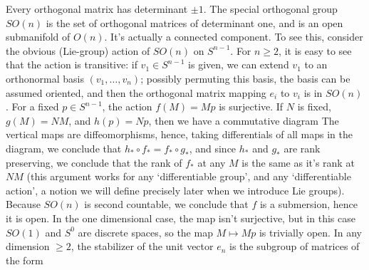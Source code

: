 \begin{example}
    Every orthogonal matrix has determinant $\pm 1$. The special orthogonal group $SO(n)$ is the set of orthogonal matrices of determinant one, and is an open submanifold of $O(n)$. It's actually a connected component. To see this, consider the obvious (Lie-group) action of $SO(n)$ on $S^{n-1}$. For $n \geq 2$, it is easy to see that the action is transitive: if $v_1 \in S^{n-1}$ is given, we can extend $v_1$ to an orthonormal basis $(v_1, \dots, v_n)$; possibly permuting this basis, the basis can be assumed oriented, and then the orthogonal matrix mapping $e_i$ to $v_i$ is in $SO(n)$.
    For a fixed $p \in S^{n-1}$, the action $f(M) = Mp$ is surjective. If $N$ is fixed, $g(M) = NM$, and $h(p) = Np$, then we have a commutative diagram
    The vertical maps are diffeomorphisms, hence, taking differentials of all maps in the diagram, we conclude that $h_* \circ f_* = f_* \circ g_*$, and since $h_*$ and $g_*$ are rank preserving, we conclude that the rank of $f_*$ at any $M$ is the same as it's rank at $NM$ (this argument works for any `differentiable group', and any `differentiable action', a notion we will define precisely later when we introduce Lie groups). Because $SO(n)$ is second countable, we conclude that $f$ is a submersion, hence it is open. In the one dimensional case, the map isn't surjective, but in this case $SO(1)$ and $S^0$ are discrete spaces, so the map $M \mapsto Mp$ is trivially open. In any dimension $\geq 2$, the stabilizer of the unit vector $e_n$ is the subgroup of matrices of the form

\end{example}
